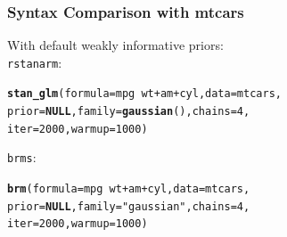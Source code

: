 \documentclass[handout]{beamer}\usepackage[]{graphicx}\usepackage[]{color}
\makeatletter
\newcommand{\hlnum}[1]{\textcolor[rgb]{0.686,0.059,0.569}{#1}}%
\newcommand{\hlstr}[1]{\textcolor[rgb]{0.192,0.494,0.8}{#1}}%
\newcommand{\hlopt}[1]{\textcolor[rgb]{0,0,0}{#1}}%
\newcommand{\hlstd}[1]{\textcolor[rgb]{0.345,0.345,0.345}{#1}}%
\newcommand{\hlkwa}[1]{\textcolor[rgb]{0.161,0.373,0.58}{\textbf{#1}}}%
\newcommand{\hlkwc}[1]{\textcolor[rgb]{0.333,0.667,0.333}{#1}}%
\newcommand{\hlkwd}[1]{\textcolor[rgb]{0.737,0.353,0.396}{\textbf{#1}}}%
\newenvironment{kframe}{%
 \def\at@end@of@kframe{}%
 \ifinner\ifhmode%
  \def\at@end@of@kframe{\end{minipage}}%
  \begin{minipage}{\columnwidth}%
 \fi\fi%
 \def\FrameCommand##1{\hskip\@totalleftmargin \hskip-\fboxsep
 \colorbox{shadecolor}{##1}\hskip-\fboxsep
     \hskip-\linewidth \hskip-\@totalleftmargin \hskip\columnwidth}%
 \MakeFramed {\advance\hsize-\width
   \@totalleftmargin\z@ \linewidth\hsize
   \@setminipage}}%
 {\par\unskip\endMakeFramed%
 \at@end@of@kframe}
\newenvironment{knitrout}{}{} %
\makeatother
\begin{document}
\begin{frame}[fragile]
\frametitle{Syntax Comparison with mtcars}
With default weakly informative priors: \\
\texttt{rstanarm}: \\

\begin{knitrout}
\color{fgcolor}\begin{kframe}
\begin{alltt}
\hlkwd{stan_glm}\hlstd{(}\hlkwc{formula} \hlstd{= mpg} \hlopt{~} \hlstd{wt} \hlopt{+} \hlstd{am} \hlopt{+} \hlstd{cyl,} \hlkwc{data} \hlstd{= mtcars,}
         \hlkwc{prior} \hlstd{=} \hlkwa{NULL}\hlstd{,} \hlkwc{family} \hlstd{=} \hlkwd{gaussian}\hlstd{(),} \hlkwc{chains} \hlstd{=} \hlnum{4}\hlstd{,}
         \hlkwc{iter} \hlstd{=} \hlnum{2000}\hlstd{,} \hlkwc{warmup} \hlstd{=} \hlnum{1000}\hlstd{)}
\end{alltt}
\end{kframe}
\end{knitrout}

\texttt{brms}: \\

\begin{knitrout}
\color{fgcolor}\begin{kframe}
\begin{alltt}
\hlkwd{brm}\hlstd{(}\hlkwc{formula} \hlstd{= mpg} \hlopt{~} \hlstd{wt} \hlopt{+} \hlstd{am} \hlopt{+} \hlstd{cyl,} \hlkwc{data} \hlstd{= mtcars,}
    \hlkwc{prior} \hlstd{=} \hlkwa{NULL}\hlstd{,} \hlkwc{family}  \hlstd{=} \hlstr{"gaussian"}\hlstd{,} \hlkwc{chains} \hlstd{=} \hlnum{4}\hlstd{,}
    \hlkwc{iter} \hlstd{=} \hlnum{2000}\hlstd{,} \hlkwc{warmup} \hlstd{=} \hlnum{1000}\hlstd{)}
\end{alltt}
\end{kframe}
\end{knitrout}


\end{frame}

\end{document}
